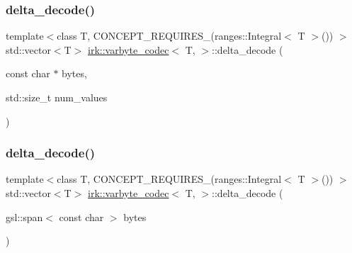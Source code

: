 \subsubsection{\texorpdfstring{delta\+\_\+decode()}{delta\_decode()}\hspace{0.1cm}{\footnotesize\ttfamily [1/3]}}
{\footnotesize\ttfamily template$<$class T, C\+O\+N\+C\+E\+P\+T\+\_\+\+R\+E\+Q\+U\+I\+R\+E\+S\+\_\+(ranges\+::\+Integral$<$ T $>$()) $>$ \\
std\+::vector$<$T$>$ \mbox{\hyperlink{structirk_1_1varbyte__codec}{irk\+::varbyte\+\_\+codec}}$<$ T, $>$\+::delta\+\_\+decode (\begin{DoxyParamCaption}\item[{const char $\ast$}]{bytes,  }\item[{std\+::size\+\_\+t}]{num\+\_\+values }\end{DoxyParamCaption})\hspace{0.3cm}{\ttfamily [inline]}}

\mbox{\label{structirk_1_1varbyte__codec_a82a9ef022440adbc15f615d25bea3d5f}} 
\subsubsection{\texorpdfstring{delta\+\_\+decode()}{delta\_decode()}\hspace{0.1cm}{\footnotesize\ttfamily [2/3]}}
{\footnotesize\ttfamily template$<$class T, C\+O\+N\+C\+E\+P\+T\+\_\+\+R\+E\+Q\+U\+I\+R\+E\+S\+\_\+(ranges\+::\+Integral$<$ T $>$()) $>$ \\
std\+::vector$<$T$>$ \mbox{\hyperlink{structirk_1_1varbyte__codec}{irk\+::varbyte\+\_\+codec}}$<$ T, $>$\+::delta\+\_\+decode (\begin{DoxyParamCaption}\item[{gsl\+::span$<$ const char $>$}]{bytes }\end{DoxyParamCaption})\hspace{0.3cm}{\ttfamily [inline]}}

\mbox{\label{structirk_1_1varbyte__codec_ad7cc0171f9745b29e76fa8de32356067}} 
